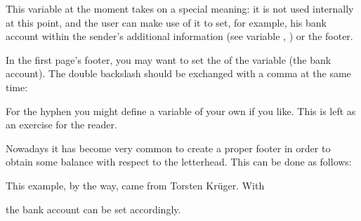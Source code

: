 \begin{Declaration}
\end{Declaration}%
%
This variable at the moment takes on a special meaning: it is not used
internally at this point, and the user can make use of it to set, for example,
his bank account within the sender's additional
information (see variable ,
) or the footer.%
%
\begin{Example}
  In the first page's footer, you may want to set the  of the
  variable  (the bank account). The double
  backslash should be exchanged with a comma at the same time:
\begin{lstcode}
\end{lstcode}
  For the hyphen you might define a variable of your own if you like.
  This is left as an exercise for the reader.

  Nowadays it has become very common to create a proper footer in
  order to obtain some balance with respect to the letterhead. This
  can be done as follows:
\begin{lstcode}
\end{lstcode}
  This example, by the way, came from Torsten Kr\"uger. With
\begin{lstcode}
\end{lstcode}
  the bank account can be set accordingly.
\end{Example}
